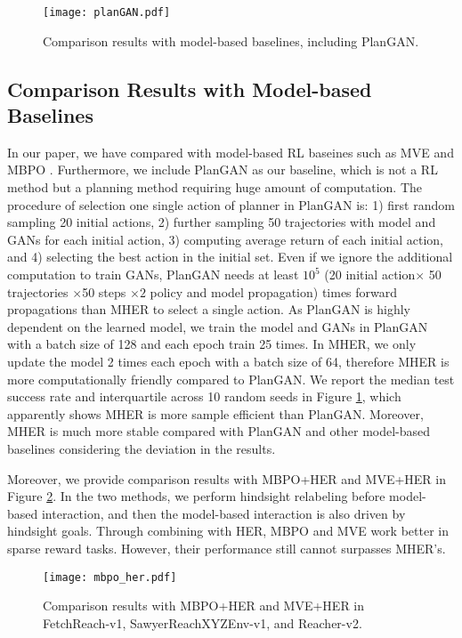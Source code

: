 \documentclass{article}
\begin{document}
\begin{figure}[htb]
    \centering
    \texttt{[image: planGAN.pdf]}
    \caption{Comparison results with model-based baselines, including PlanGAN.}
    \label{fig:model_bl_planGAN}
\end{figure}

\subsection{Comparison Results with Model-based Baselines}
\label{ap:comparison_with_model_based}
In our paper, we have compared with model-based RL baseines such as MVE \cite{feinberg2018model} and MBPO \cite{DBLP:conf/nips/JannerFZL19}. Furthermore, we include PlanGAN as our baseline, which is not a RL method but a planning method requiring huge amount of computation. The procedure of selection one single action of planner in PlanGAN is: 1) first random sampling 20 initial actions, 2) further sampling 50 trajectories with model and GANs for each initial action, 3) computing average return of each initial action, and 4) selecting the best action in the initial set. Even if we ignore the additional computation to train GANs, PlanGAN needs at least $10^5$ (20 initial action$\times$ 50 trajectories $\times $50 steps $\times 2$ policy and model propagation) times forward propagations than MHER to select a single action. As PlanGAN is highly dependent on the learned model, we train the model and GANs in PlanGAN with a batch size of 128 and each epoch train 25 times. In MHER, we only update the model 2 times each epoch with a batch size of 64, therefore MHER is more computationally friendly compared to PlanGAN. We report the median test success rate and interquartile across 10 random seeds in Figure \ref{fig:model_bl_planGAN}, which apparently shows MHER is more sample efficient than PlanGAN. Moreover, MHER is much more stable compared with PlanGAN and other model-based baselines considering the deviation in the results.

Moreover, we provide comparison results with 
MBPO+HER and MVE+HER in Figure \ref{fig:mbpo_her}. In the two methods, we perform hindsight relabeling before model-based interaction, and then the model-based interaction is also driven by hindsight goals. Through combining with HER, MBPO and MVE work better in sparse reward tasks. However, their performance still cannot surpasses MHER's.

\begin{figure}
    \centering
    \texttt{[image: mbpo\_her.pdf]}
    \caption{Comparison results with MBPO+HER and MVE+HER in FetchReach-v1, SawyerReachXYZEnv-v1, and Reacher-v2.}
    \label{fig:mbpo_her}
\end{figure}
\end{document}
